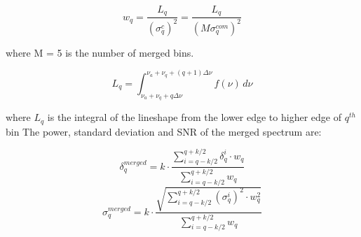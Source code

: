 
\begin{equation}
    \label{eq:merge_weight}
    w_{q} = \frac{L_{q}}{(\sigma_{q}^{c})^{2}} = \frac{L_{q}}{(M\sigma_{q}^{com})^{2}}
\end{equation}

where M = 5 is the number of merged bins.


\begin{equation}
    \label{eq:Lq_integtal}
    L_{q} = \int_{\nu_a +\nu_q + q\Delta\nu}^{\nu_a +\nu_q + (q+1)\Delta\nu} f(\nu) \,d\nu
\end{equation}

where $L_q$ is the integral of the lineshape from the lower edge to higher edge of ${q^{th}}$ bin
The power, standard deviation and SNR of the merged spectrum are:


\begin{equation}
    \label{eq:merged_power}
    \delta_{q}^{merged} = k \cdot \frac{ \sum_{i = q-k/2}^{q+k/2}\delta_{q}^{i} \cdot {w_{q}}}{\sum_{i = q-k/2}^{q+k/2} {w_{q}}}
\end{equation}
\begin{equation}
    \label{eq:merged_sigma}
    \sigma_{q}^{merged} = k \cdot \frac{ \sqrt{\sum_{i = q-k/2}^{q+k/2} (\sigma_{q}^{i})^2 \cdot {w_{q}^2}}}{\sum_{i = q-k/2}^{q+k/2} {w_{q}}}
\end{equation}

